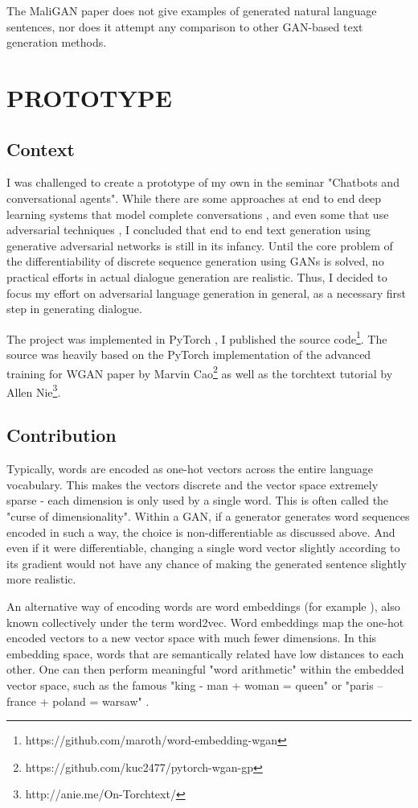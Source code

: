 \documentclass[a4paper,conference]{IEEEtran}
\begin{document}
The MaliGAN paper does not give examples of generated natural language sentences, nor does it attempt any comparison to other GAN-based text generation methods.

\section{PROTOTYPE}
\subsection{Context}
I was challenged to create a prototype of my own in the seminar "Chatbots and conversational agents". While there are some approaches at end to end deep learning systems that model complete conversations \cite{c27}, and even some that use adversarial techniques \cite{c28} \cite{c29}, I concluded that end to end text generation using generative adversarial networks is still in its infancy. Until the core problem of the differentiability of discrete sequence generation using GANs is solved, no practical efforts in actual dialogue generation are realistic. Thus, I decided to focus my effort on adversarial language generation in general, as a necessary first step in generating dialogue.

The project was implemented in PyTorch \cite{c32}, I published the source code\footnote{https://github.com/maroth/word-embedding-wgan}. The source was heavily based on the PyTorch implementation of the advanced training for WGAN paper \cite{c21} by Marvin Cao\footnote{https://github.com/kuc2477/pytorch-wgan-gp} as well as the torchtext tutorial by Allen Nie\footnote{http://anie.me/On-Torchtext/}.

\subsection{Contribution}
Typically, words are encoded as one-hot vectors across the entire language vocabulary. This makes the vectors discrete and the vector space extremely sparse - each dimension is only used by a single word. This is often called the "curse of dimensionality". Within a GAN, if a generator generates word sequences encoded in such a way, the choice is non-differentiable as discussed above. And even if it were differentiable, changing a single word vector slightly according to its gradient would not have any chance of making the generated sentence slightly more realistic.

An alternative way of encoding words are word embeddings (for example \cite{c31}), also known collectively under the term word2vec. Word embeddings map the one-hot encoded vectors to a new vector space with much fewer dimensions. In this embedding space, words that are semantically related have low distances to each other. One can then perform meaningful "word arithmetic" within the embedded vector space, such as the famous "king - man + woman = queen" or "paris – france + poland = warsaw" \cite{c32}. 
\end{document}
